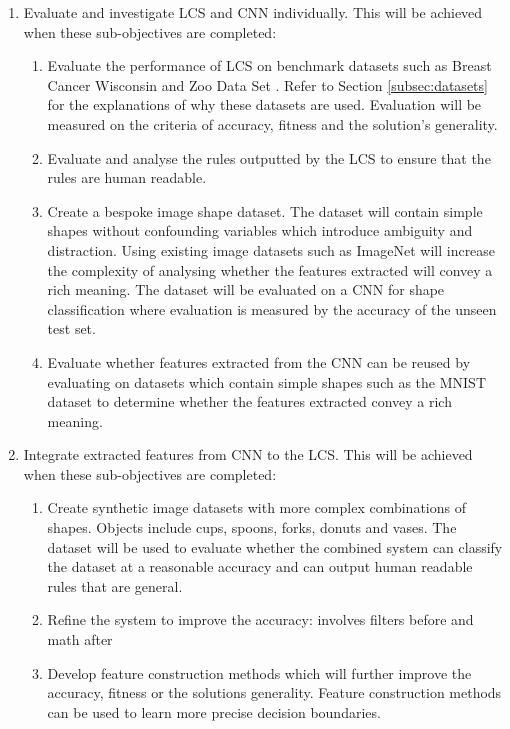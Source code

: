 \begin{enumerate}
	\item  Evaluate and investigate LCS and CNN individually. This will be achieved when these sub-objectives are completed:
	
	\begin{enumerate}
		\item Evaluate the performance of LCS on benchmark datasets such as Breast Cancer Wisconsin \cite{wisconsinbreast} and Zoo Data Set \cite{zoodata}. Refer to Section \ref{subsec:datasets} for the explanations of why these datasets are used. Evaluation will be measured on the criteria of accuracy, fitness and the solution's generality.
		\item Evaluate and analyse the rules outputted by the LCS to ensure that the rules are human readable.
		
		\item Create a bespoke image shape dataset. The dataset will contain simple shapes without confounding variables which introduce ambiguity and distraction. Using existing image datasets such as ImageNet \cite{imagenet} will increase the complexity of analysing whether the features extracted will convey a rich meaning. The dataset will be evaluated on a CNN for shape classification where evaluation is measured by the accuracy of the unseen test set.
		
		\item Evaluate whether features extracted from the CNN can be reused by evaluating on datasets which contain simple shapes such as the MNIST dataset to determine whether the features extracted convey a rich meaning.
		
	\end{enumerate}
	
	\item  Integrate extracted features from CNN to the LCS. This will be achieved when these sub-objectives are completed:
	
	\begin{enumerate}
		\item Create synthetic image datasets with more complex combinations of shapes. Objects include cups, spoons, forks, donuts and vases. The dataset will be used to evaluate whether the combined system can classify the dataset at a reasonable accuracy and can output human readable rules that are general.  
		
		\item Refine the system to improve the accuracy: involves filters before and math after
		\item Develop feature construction methods which will further improve the accuracy, fitness or the solution\textquotesingle s generality. Feature construction methods can be used to learn more precise decision boundaries.
		

\end{enumerate}
\end{enumerate}
